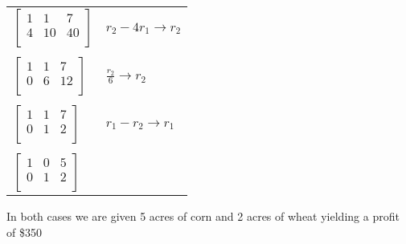 \documentclass[a4paper,man,natbib]{apa6}
\begin{document}
\begin{tabular}{ll}	
	$ \begin{bmatrix}
		1 & 1  & 7  \\
		4 & 10 & 40 \\
	\end{bmatrix} $ &
	$ r_2 - 4r_1 \rightarrow r_2 $ \\
	& \\
	$ \begin{bmatrix}
		1 & 1  & 7  \\
		0 & 6 & 12 \\
	\end{bmatrix} $ &
	$ \frac{r_2}{6} \rightarrow r_2 $ \\
	& \\
	$ \begin{bmatrix}
		1 & 1 & 7 \\
		0 & 1 & 2 \\
	\end{bmatrix} $ &
	$ r_1 - r_2 \rightarrow r_1 $ \\
	& \\
	$ \begin{bmatrix}
		1 & 0 & 5 \\
		0 & 1 & 2 \\
	\end{bmatrix} $ & \\
\end{tabular}
	
\singlespacing
In both cases we are given 
5 acres of corn and 
2 acres of wheat 
yielding a profit of \$350

\newpage
\end{document}

